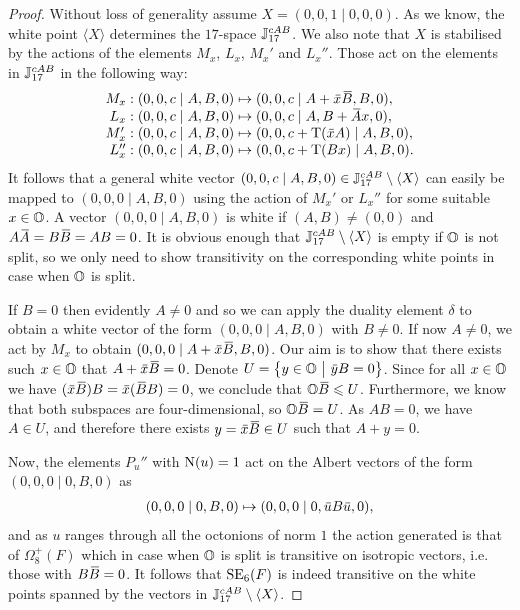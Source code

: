 \begin{proof}
	Without loss of generality assume $X = (0,0,1\mid 0,0,0)$. As we know, the white 
	point $\langle X \rangle$ determines the $17$-space $\mathbb{J}_{17}^{cAB}$. We also note that
	$X$ is stabilised by the actions of the elements $M_x$, $L_x$, $M_x'$ and $L_x''$. Those
	act on the elements in $\mathbb{J}_{17}^{cAB}$ in the following way:
	\begin{equation*}
		\begin{array}{r@{\;}c@{\;}l}
			M_x : (0,0,c\mid A,B,0) & \mapsto & (0,0,c\mid A+\ovx \ovB,B,0), \\
			L_x : (0,0,c\mid A,B,0) & \mapsto & (0,0,c\mid A,B+\ovA x,0), \\
			M_x' : (0,0,c\mid A,B,0) & \mapsto & (0,0,c+\Tr(\ovx A) \mid A,B,0), \\
			L_x'' : (0,0,c\mid A,B,0) & \mapsto & (0,0,c+\Tr(B x) \mid A,B,0).
		\end{array}
	\end{equation*}
	It follows that a general white vector $(0,0,c\mid A,B,0) \in \mathbb{J}_{17}^{cAB}\setminus
	 \langle X
	\rangle$ can easily be mapped to $(0,0,0\mid A,B,0)$ using the action of $M_x'$ or 
	$L_x''$ for some suitable $x \in \mathbb{O}$. A vector $(0,0,0\mid A,B,0)$ is white if
	$(A,B) \neq (0,0)$ and $A\ovA = B\ovB = AB = 0$. It is obvious enough that 
	$\mathbb{J}_{17}^{cAB} \setminus \langle X \rangle$ is empty if $\mathbb{O}$ is not split,
	so we only need to show transitivity on the corresponding white points in case
	when $\mathbb{O}$ is split.
	
	If $B = 0$ then evidently $A \neq 0$ and so we can apply the duality element $\delta$
	to obtain a white vector of the form $(0,0,0\mid A,B,0)$ with $B \neq 0$. 
	If now $A \neq 0$, we act by $M_x$ to obtain $(0,0,0\mid A+\ovx \ovB,B,0)$. Our 
	aim is to show that there exists such $x \in \mathbb{O}$ that $A+\ovx \ovB = 0$. 
	Denote $U = \left\{ y \in \mathbb{O}\ \big|\ \mathord{\mbox{\hspace*{0pt}}\,\overline{\!y\!\!\;}\!\:}\mbox{\hspace*{0pt}} B = 0\right\}$. Since for all
	$x \in \mathbb{O}$ we have $(\ovx \ovB) B = \ovx (\ovB B) = 0$, we conclude
	that $\mathbb{O} \mathord{\mbox{\hspace*{0pt}}\,\overline{\!B\!\!\;}\!\:}\mbox{\hspace*{0pt}} \leqslant U$. Furthermore, we know that both
	subspaces are four-dimensional, so $\mathbb{O}\mathord{\mbox{\hspace*{0pt}}\,\overline{\!B\!\!\;}\!\:}\mbox{\hspace*{0pt}} = U$. As $AB = 0$, we have $A \in U$, and
	therefore there exists $y = \ovx\ovB \in U$ such that $A+y = 0$.
	
	Now, the elements $P_u''$ with $\mathord{\mathrm{N}}(u)=1$ act on the Albert vectors of the form 
	$(0,0,0\mid 0,B,0)$ as
	\begin{equation*}
		\begin{array}{r@{\;}c@{\;}l}
			(0,0,0\mid 0,B,0) & \mapsto & (0,0,0\mid 0,\ovu B \ovu,0),
		\end{array}
	\end{equation*}
	and as $u$ ranges through all the octonions of norm $1$ the action generated is that
	of $\Omega_8^+(F)$ which in case when $\mathbb{O}$ is split is transitive on isotropic vectors,
	 i.e. those with $B\mathord{\mbox{\hspace*{0pt}}\,\overline{\!B\!\!\;}\!\:}\mbox{\hspace*{0pt}} = 0$.
	 It follows that $\mathrm{SE}_6(F)$ is indeed transitive on the white
	 points spanned by the vectors in $\mathbb{J}_{17}^{cAB} \setminus \langle X \rangle$.
	 

\end{proof}

